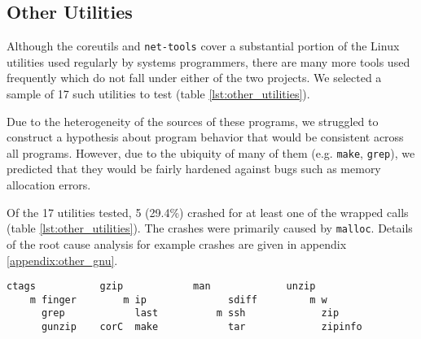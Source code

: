 \subsection{Other Utilities}
Although the coreutils and \texttt{net-tools} cover a substantial portion of the Linux utilities used regularly by systems programmers, there are many more tools used frequently which do not fall under either of the two projects. We selected a sample of 17 such utilities to test (table \ref{lst:other_utilities}).

Due to the heterogeneity of the sources of these programs, we struggled to construct a hypothesis about program behavior that would be consistent across all programs. However, due to the ubiquity of many of them (e.g. \texttt{make}, \texttt{grep}), we predicted that they would be fairly hardened against bugs such as memory allocation errors.

Of the 17 utilities tested, 5 (29.4\%) crashed for at least one of the wrapped calls (table \ref{lst:other_utilities}). The crashes were primarily caused by \texttt{malloc}. Details of the root cause analysis for example crashes are given in appendix \ref{appendix:other_gnu}.

\PreTable
\begin{lstlisting}[label={lst:other_utilities},caption={Other small-scale utilities tested; those which crashed are indicated with a letter to their left (\texttt{c/o/r} = \texttt{close/open/read}, \texttt{C} = \texttt{calloc}, \texttt{m} = \texttt{realloc}). A total of 5/17 (29.4\%) crashed for at least one call.}]
      ctags           gzip            man             unzip
    m finger        m ip              sdiff         m w
      grep            last          m ssh             zip
      gunzip    corC  make            tar             zipinfo
\end{lstlisting}
\PostTable

